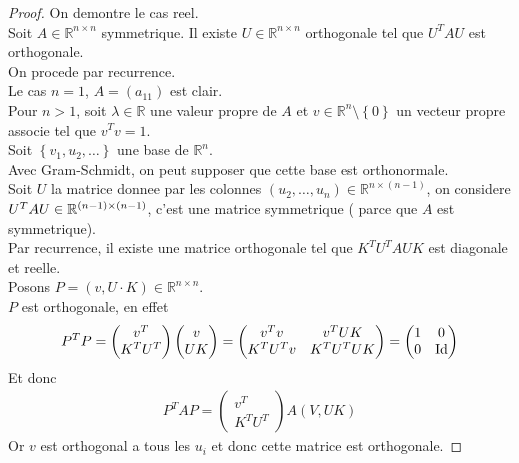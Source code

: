 \documentclass[../main.tex]{subfiles}
\begin{document}
\begin{proof}
		On demontre le cas reel.\\
		Soit $A \in \mathbb{R}^{n\times n}$ symmetrique. Il existe $U \in \mathbb{R}^{n\times n}$ orthogonale tel que $U^{T}A U$ est orthogonale.\\
		On procede par recurrence.\\
		Le cas $n=1$, $A= ( a_{11}) $ est clair.\\
		Pour $n>1$, soit $\lambda \in \mathbb{R}$ une valeur propre de $A$ et $v \in \mathbb{R}^{n}\setminus \left\{ 0 \right\} $ un vecteur propre associe  tel que $v^{T}v =1$.\\
		Soit $  \left\{ v_1, u_2, \ldots \right\} $ une base de $ \mathbb{R}^n$.\\
		Avec Gram-Schmidt, on peut supposer que cette base est orthonormale.\\
		Soit $U$ la matrice donnee par les colonnes  $(  u_2,\ldots, u_n) \in \mathbb{R}^{n \times ( n-1) }$, on considere $U\\^{T}A U\in \mathbb{R}^{( n-1) \times ( n-1) }$, c'est une matrice symmetrique ( parce que $A$ est symmetrique).\\
		Par recurrence, il existe une matrice orthogonale tel que $K^{T}U^{T}A U K $ est diagonale et reelle.\\
		Posons $P =( v, U\cdot K) \in \mathbb{R}^{n\times n}$.\\
		$P$ est orthogonale, en effet
		\[ 
		P^{T}P = 
		\begin{pmatrix}
		v^{T}\\ K^{T}U^{T}
		\end{pmatrix}
		\begin{pmatrix}
		v\\ U K
		\end{pmatrix}
		= 
		\begin{pmatrix}
			v^{T}v & v^{T}U K\\
			K^{T}U^{T}v& K^{T}U^{T}U K
		\end{pmatrix}
		=
		\begin{pmatrix}
			1 & 0\\
			0 & \operatorname*{Id}\\
		\end{pmatrix}
		\]
		Et donc 
		 \begin{align*}
	P^{T}A P =
	\begin{pmatrix}
	v^{T}\\K^{T}U^{T}
	\end{pmatrix}
	A
	( V, UK) 
	\end{align*}
	Or $v$ est orthogonal a tous les $u_i$  et donc cette matrice est orthogonale.
		
		
\end{proof}
\end{document}
